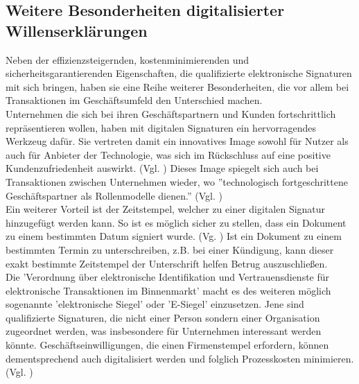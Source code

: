 \documentclass[deutsch]{lib/llncs/llncs}
\begin{document}
\subsection{Weitere Besonderheiten digitalisierter Willenserklärungen}
Neben der effizienzsteigernden, kostenminimierenden und sicherheitsgarantierenden Eigenschaften, die qualifizierte elektronische Signaturen mit sich bringen, haben sie eine Reihe weiterer Besonderheiten, die vor allem bei Transaktionen im Geschäftsumfeld den Unterschied machen. \\
Unternehmen die sich bei ihren Geschäftspartnern und Kunden fortschrittlich repräsentieren wollen, haben mit digitalen Signaturen ein hervorragendes Werkzeug dafür. Sie vertreten damit ein innovatives Image sowohl für Nutzer als auch für Anbieter der Technologie, was sich im Rückschluss auf eine positive Kundenzufriedenheit auswirkt. (Vgl. \cite[S. 7]{Zitat05}) Dieses Image spiegelt sich auch bei Transaktionen zwischen Unternehmen wieder, wo ''technologisch fortgeschrittene Geschäftspartner als Rollenmodelle dienen.'' (Vgl. \cite[S. 12]{Zitat05}) \\
Ein weiterer Vorteil ist der Zeitstempel, welcher zu einer digitalen Signatur hinzugefügt werden kann. So ist es möglich sicher zu stellen, dass ein Dokument zu einem bestimmten Datum signiert wurde. (Vg. \cite[S. 7]{Zitat05}) Ist ein Dokument zu einem bestimmten Termin zu unterschreiben, z.B. bei einer Kündigung, kann dieser exakt bestimmte Zeitstempel der Unterschrift helfen Betrug auszuschließen. \\
Die 'Verordnung über elektronische Identifikation und Vertrauensdienste für elektronische Transaktionen im Binnenmarkt' macht es des weiteren möglich sogenannte 'elektronische Siegel' oder 'E-Siegel' einzusetzen. Jene sind qualifizierte Signaturen, die nicht einer Person sondern einer Organisation zugeordnet werden, was insbesondere für Unternehmen interessant werden könnte. Geschäftseinwilligungen, die einen Firmenstempel erfordern, können dementsprechend auch digitalisiert werden und folglich Prozesskosten minimieren. (Vgl. \cite[S. 30-31]{Zitat05})
\end{document}
